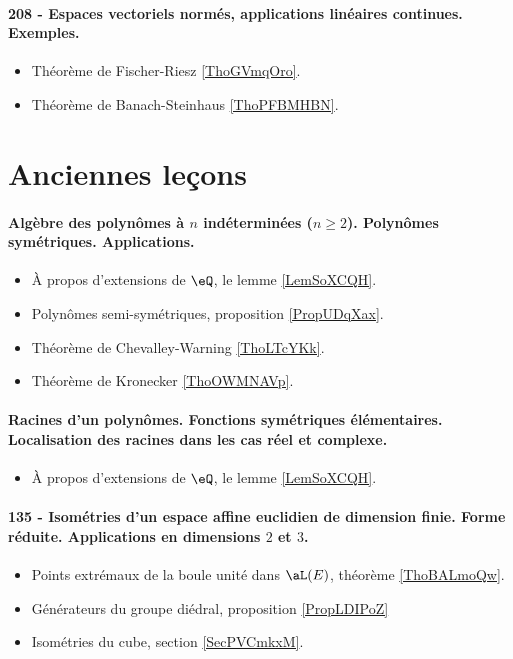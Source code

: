 \paragraph{208 - Espaces vectoriels normés, applications linéaires continues. Exemples.}
\begin{itemize}
    \item Théorème de Fischer-Riesz \ref{ThoGVmqOro}.
    \item Théorème de Banach-Steinhaus \ref{ThoPFBMHBN}.
\end{itemize}

\section{Anciennes leçons}


\paragraph{Algèbre des polynômes à \( n\) indéterminées (\( n\geq 2\)). Polynômes symétriques. Applications.}
\begin{itemize}
    \item À propos d'extensions de \( \eQ\), le lemme \ref{LemSoXCQH}.
    \item Polynômes semi-symétriques, proposition \ref{PropUDqXax}.
    \item Théorème de Chevalley-Warning \ref{ThoLTcYKk}.
    \item Théorème de Kronecker \ref{ThoOWMNAVp}.
\end{itemize}

\paragraph{Racines d’un polynômes. Fonctions symétriques élémentaires. Localisation des racines dans les cas réel et complexe.}
\begin{itemize}
    \item À propos d'extensions de \( \eQ\), le lemme \ref{LemSoXCQH}.
\end{itemize}

\paragraph{135 - Isométries d'un espace affine euclidien de dimension finie. Forme réduite. Applications en dimensions $2$ et $3$.}
\begin{itemize}
    \item Points extrémaux de la boule unité dans \( \aL(E)\), théorème \ref{ThoBALmoQw}.
    \item Générateurs du groupe diédral, proposition \ref{PropLDIPoZ}
    \item Isométries du cube, section \ref{SecPVCmkxM}.
\end{itemize}

